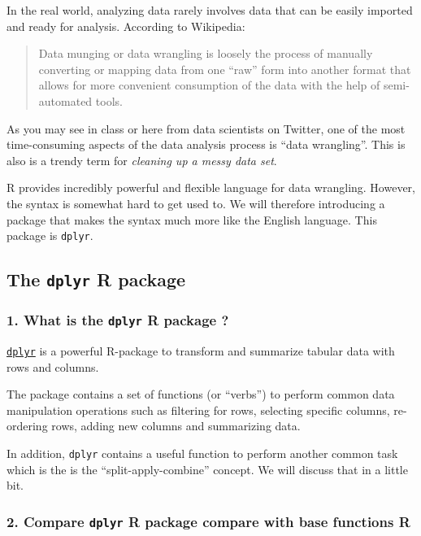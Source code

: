 \documentclass[]{article}
\begin{document}
In the real world, analyzing data rarely involves data that can be
easily imported and ready for analysis. According to Wikipedia:

\begin{quote}
Data munging or data wrangling is loosely the process of manually
converting or mapping data from one ``raw'' form into another format
that allows for more convenient consumption of the data with the help of
semi-automated tools.
\end{quote}

As you may see in class or here from data scientists on Twitter, one of
the most time-consuming aspects of the data analysis process is ``data
wrangling''. This is also is a trendy term for \emph{cleaning up a messy
data set}.

R provides incredibly powerful and flexible language for data wrangling.
However, the syntax is somewhat hard to get used to. We will therefore
introducing a package that makes the syntax much more like the English
language. This package is \texttt{dplyr}.

\hypertarget{the-dplyr-r-package}{%
\subsection{\texorpdfstring{The \texttt{dplyr} R
package}{The dplyr R package}}\label{the-dplyr-r-package}}

\hypertarget{what-is-the-dplyr-r-package}{%
\subsubsection{\texorpdfstring{1. What is the \texttt{dplyr} R package
?}{1. What is the dplyr R package ?}}\label{what-is-the-dplyr-r-package}}

\href{http://cran.rstudio.com/web/packages/dplyr/vignettes/introduction.html}{\texttt{dplyr}}
is a powerful R-package to transform and summarize tabular data with
rows and columns.

The package contains a set of functions (or ``verbs'') to perform common
data manipulation operations such as filtering for rows, selecting
specific columns, re-ordering rows, adding new columns and summarizing
data.

In addition, \texttt{dplyr} contains a useful function to perform
another common task which is the is the ``split-apply-combine'' concept.
We will discuss that in a little bit.

\hypertarget{compare-dplyr-r-package-compare-with-base-functions-r}{%
\subsubsection{\texorpdfstring{2. Compare \texttt{dplyr} R package
compare with base functions
R}{2. Compare dplyr R package compare with base functions R}}\label{compare-dplyr-r-package-compare-with-base-functions-r}}
\end{document}
